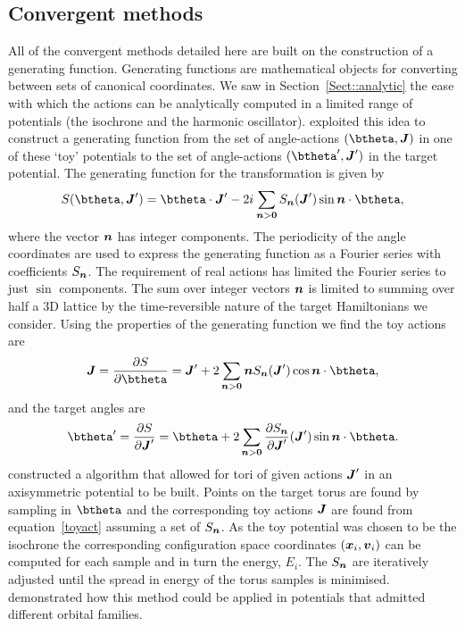 \documentclass[useAMS,usenatbib,fleqn,a4paper]{mn2e}
\def\i{{i\mkern1mu}}
\newcommand{\bs}[1]{\bmath{#1}}
\begin{document}
\subsection{Convergent methods}\label{Sect::MethodsC}
All of the convergent methods detailed here are built on the construction of a generating function. Generating functions are mathematical objects for converting between sets of canonical coordinates. We saw in Section~\ref{Sect::analytic} the ease with which the actions can be analytically computed in a limited range of potentials (the isochrone and the harmonic oscillator). \cite{McGillBinney} exploited this idea to construct a generating function from the set of angle-actions $(\btheta,\boldsymbol{J})$ in one of these `toy' potentials to the set of angle-actions $(\btheta',\boldsymbol{J}')$ in the target potential. The generating function for the transformation is given by
\begin{equation}\label{eq:genGF}
S(\btheta,\bs{J}') = \btheta\cdot\bs{J}'
-2\i \sum_{\bs{n}>\bs{0}}S_{\bs{n}}(\bs{J}')\sin\bs{n}\cdot\btheta,
\end{equation}
where the vector $\bs{n}$ has integer components. The periodicity of the angle coordinates are used to express the generating function as a Fourier series with coefficients $S_{\bs{n}}$. The requirement of real actions has limited the Fourier series to just $\sin$ components. The sum over integer vectors $\bs{n}$ is limited to summing over half a 3D lattice by the time-reversible nature of the target Hamiltonians we consider. Using the properties of the generating function we find the toy actions are
\begin{equation}
\bs{J}=\frac{\partial S}{\partial \btheta} = \bs{J}'+2\sum_{\bs{n}>\bs{0}}\bs{n}S_{\bs{n}}(\bs{J}')\cos\bs{n}\cdot\btheta,
\label{toyact}
\end{equation}
and the target angles are
\begin{equation}
\btheta'=\frac{\partial S}{\partial \bs{J}'}
= \btheta+2\sum_{\bs{n}>\bs{0}}\frac{\partial S_{\bs{n}}}{\partial \bs{J}'}(\bs{J}')\sin\bs{n}\cdot\btheta.
\label{targetang}
\end{equation}
\cite{McGillBinney} constructed a algorithm that allowed for tori of given actions $\bs{J}'$ in an axisymmetric potential to be built. Points on the target torus are found by sampling in $\btheta$ and the corresponding toy actions $\bs{J}$ are found from equation~\eqref{toyact} assuming a set of $S_{\bs{n}}$. As the toy potential was chosen to be the isochrone the corresponding configuration space coordinates $(\bs{x}_i,\bs{v}_i)$ can be computed for each sample and in turn the energy, $E_i$. The $S_{\bs{n}}$ are iteratively adjusted until the spread in energy of the torus samples is minimised. \cite{KaasalainenB} demonstrated how this method could be applied in potentials that admitted different orbital families.
\end{document}
